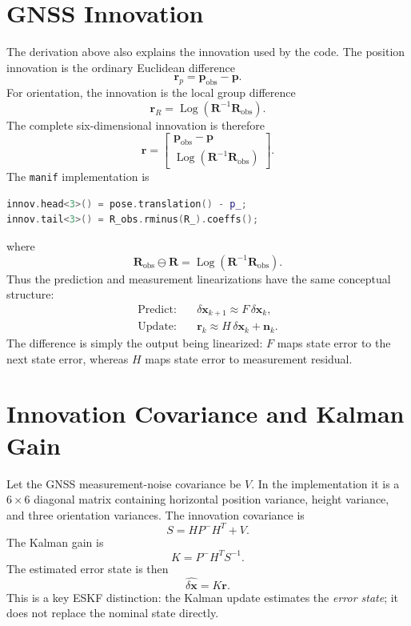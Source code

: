 \documentclass[11pt]{article}
\newcommand{\R}{\mathbf{R}}
\newcommand{\p}{\mathbf{p}}
\newcommand{\Log}{\operatorname{Log}}
\begin{document}
\section{GNSS Innovation}
The derivation above also explains the innovation used by the code. The position innovation is the ordinary Euclidean difference
\begin{equation}
\boxed{
\bm r_p = \p_{\mathrm{obs}}-\p.
}
\end{equation}
For orientation, the innovation is the local group difference
\begin{equation}
\boxed{
\bm r_R
=
\Log\!\left(\R^{-1}\R_{\mathrm{obs}}\right).
}
\end{equation}
The complete six-dimensional innovation is therefore
\begin{equation}
\boxed{
\bm r =
\begin{bmatrix}
\p_{\mathrm{obs}}-\p\\[2mm]
\Log\!\left(\R^{-1}\R_{\mathrm{obs}}\right)
\end{bmatrix}.
}
\end{equation}
The \texttt{manif} implementation is
\begin{lstlisting}[language=C++,basicstyle=\ttfamily\small]
innov.head<3>() = pose.translation() - p_;
innov.tail<3>() = R_obs.rminus(R_).coeffs();
\end{lstlisting}
where
\begin{equation}
\R_{\mathrm{obs}}\ominus\R
=
\Log(\R^{-1}\R_{\mathrm{obs}}).
\end{equation}
Thus the prediction and measurement linearizations have the same conceptual structure:
\begin{align}
\text{Predict:}\quad
&\delta\bm x_{k+1}
\approx
F\,\delta\bm x_k,\\
\text{Update:}\quad
&\bm r_k
\approx
H\,\delta\bm x_k+\bm n_k.
\end{align}
The difference is simply the output being linearized: $F$ maps state error to the next state error, whereas $H$ maps state error to measurement residual.

\section{Innovation Covariance and Kalman Gain}
Let the GNSS measurement-noise covariance be $V$. In the implementation it is a $6\times6$ diagonal matrix containing horizontal position variance, height variance, and three orientation variances. The innovation covariance is
\begin{equation}
\boxed{
S = H P^{-}H^{T}+V.
}
\end{equation}
The Kalman gain is
\begin{equation}
\boxed{
K=P^{-}H^{T}S^{-1}.
}
\end{equation}
The estimated error state is then
\begin{equation}
\boxed{
\widehat{\delta\bm x}=K\bm r.
}
\end{equation}
This is a key ESKF distinction: the Kalman update estimates the \emph{error state}; it does not replace the nominal state directly.
\end{document}
